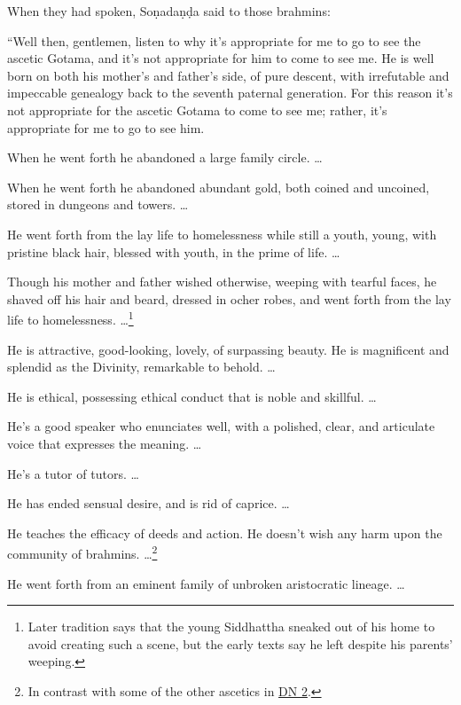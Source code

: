 \documentclass[12pt,openany]{book}%
\begin{document}
When they had spoken, \textsanskrit{Soṇadaṇḍa} said to those brahmins: 

“Well then, gentlemen, listen to why it’s appropriate for me to go to see the ascetic Gotama, and it’s not appropriate for him to come to see me. He is well born on both his mother’s and father’s side, of pure descent, with irrefutable and impeccable genealogy back to the seventh paternal generation. For this reason it’s not appropriate for the ascetic Gotama to come to see me; rather, it’s appropriate for me to go to see him. 

When he went forth he abandoned a large family circle. … 

When he went forth he abandoned abundant gold, both coined and uncoined, stored in dungeons and towers. … 

He went forth from the lay life to homelessness while still a youth, young, with pristine black hair, blessed with youth, in the prime of life. … 

Though his mother and father wished otherwise, weeping with tearful faces, he shaved off his hair and beard, dressed in ocher robes, and went forth from the lay life to homelessness. …\footnote{Later tradition says that the young Siddhattha sneaked out of his home to avoid creating such a scene, but the early texts say he left despite his parents’ weeping. } 

He is attractive, good-looking, lovely, of surpassing beauty. He is magnificent and splendid as the Divinity, remarkable to behold. … 

He is ethical, possessing ethical conduct that is noble and skillful. … 

He’s a good speaker who enunciates well, with a polished, clear, and articulate voice that expresses the meaning. … 

He’s a tutor of tutors. … 

He has ended sensual desire, and is rid of caprice. … 

He teaches the efficacy of deeds and action. He doesn’t wish any harm upon the community of brahmins. …\footnote{In contrast with some of the other ascetics in \href{https://suttacentral.net/dn2/en/sujato}{DN 2}. } 

He went forth from an eminent family of unbroken aristocratic lineage. … 
\end{document}
